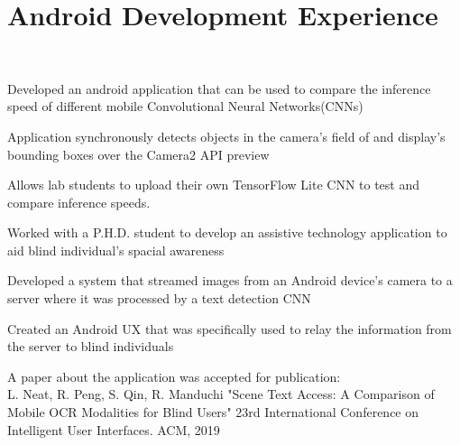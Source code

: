 \documentclass[letterpaper]{deedy-resume} %
\begin{document}
\begin{minipage}[t]{0.66\textwidth} %


\section{Android Development Experience}

\\
\vspace{\topsep}
\begin{tightitemize}
	\item Developed an android application that can be used to compare the inference  speed of different mobile Convolutional Neural Networks(CNNs)
	\item Application synchronously detects objects in the camera's field of and display's bounding boxes over the Camera2 API preview
	\item Allows lab students to upload their own TensorFlow Lite CNN to test and compare inference speeds.
\end{tightitemize}

\begin{tightitemize}
	\item Worked with a P.H.D. student to develop an assistive technology application to aid blind individual's spacial awareness 
	\item Developed a system that streamed images from an Android device's camera to a server where it was processed by a text detection CNN
	\item Created an Android UX that was specifically used to relay the information from the server to blind individuals
	\item A paper about the application was accepted for publication: \\
	L. Neat, R. Peng, S. Qin, R. Manduchi "Scene Text Access: A Comparison of  Mobile OCR Modalities for Blind Users" 23rd International Conference on Intelligent User Interfaces. ACM, 2019
	

\end{tightitemize}
\end{minipage}
\end{document}
